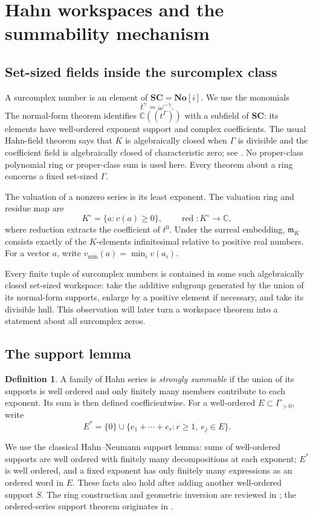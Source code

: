 \documentclass[11pt,letterpaper]{article}
\theoremstyle{definition}
\newtheorem{definition}[definition]{Definition}
\theoremstyle{remark}
\newcommand{\C}{\mathbb C}
\newcommand{\No}{\mathbf{No}}
\newcommand{\SC}{\mathbf{SC}}
\newcommand{\m}{\mathfrak m}
\newcommand{\vmin}{v_{\min}}
\numberwithin{equation}{section}
\begin{document}
\section{Hahn workspaces and the summability mechanism}\label{sec:hahn}

\subsection{Set-sized fields inside the surcomplex class}
A surcomplex number is an element of $\SC=\No[i]$. We use the monomials
\[
 t^\gamma=\omega^{-\gamma}.
\]
The normal-form theorem identifies $\C((t^\Gamma))$ with a subfield of $\SC$: its elements have well-ordered exponent support and complex coefficients. The usual Hahn-field theorem says that $K$ is algebraically closed when $\Gamma$ is divisible and the coefficient field is algebraically closed of characteristic zero; see \cite{Poonen}. No proper-class polynomial ring or proper-class sum is used here. Every theorem about a ring concerns a fixed set-sized $\Gamma$.

The valuation of a nonzero series is its least exponent. The valuation ring and residue map are
\[
 K^\circ=\{a:v(a)\ge0\},\qquad
 \operatorname{red}:K^\circ\to\C,
\]
where reduction extracts the coefficient of $t^0$. Under the surreal embedding, $\m_K$ consists exactly of the $K$-elements infinitesimal relative to positive real numbers. For a vector $a$, write $\vmin(a)=\min_i v(a_i)$.

Every finite tuple of surcomplex numbers is contained in some such algebraically closed set-sized workspace: take the additive subgroup generated by the union of its normal-form supports, enlarge by a positive element if necessary, and take its divisible hull. This observation will later turn a workspace theorem into a statement about all surcomplex zeros.

\subsection{The support lemma}
\begin{definition}
A family of Hahn series is \emph{strongly summable} if the union of its supports is well ordered and only finitely many members contribute to each exponent. Its sum is then defined coefficientwise.
For a well-ordered $E\subset\Gamma_{>0}$, write
\[
 E^*=\{0\}\cup\{e_1+\cdots+e_r:r\ge1,\ e_j\in E\}.
\]
\end{definition}

We use the classical Hahn--Neumann support lemma: sums of well-ordered supports are well ordered with finitely many decompositions at each exponent; $E^*$ is well ordered, and a fixed exponent has only finitely many expressions as an ordered word in $E$. These facts also hold after adding another well-ordered support $S$. The ring construction and geometric inversion are reviewed in \cite[\S3]{Poonen}; the ordered-series support theorem originates in \cite{Neumann}.
\end{document}
